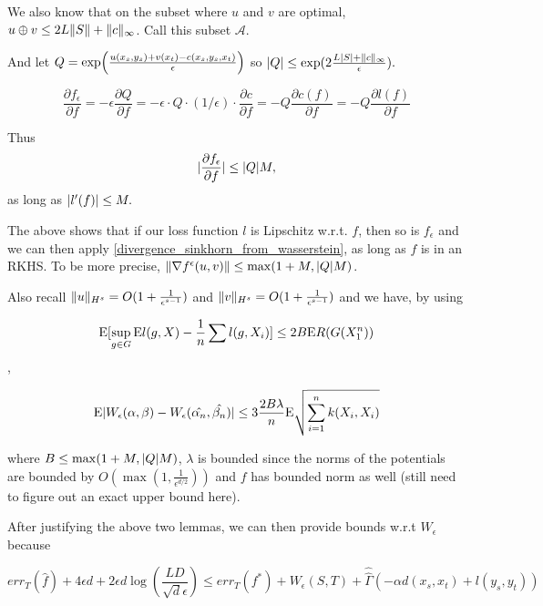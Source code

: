 We also know that on the subset where $u$ and $v$ are optimal, $u\oplus v\leq 2L\lVert S\rVert+\lVert c\rVert_{\infty}$. Call this subset $\mathcal{A}$.

And let $Q=\exp \paren*{\frac{u(x_s,y_s)+v(x_t)-c(x_s,y_s,x_t)}{\epsilon}}$ so $\lvert Q\rvert\leq \exp(2\frac{L\lvert S\rvert+\lVert c\rVert_{\infty}}{\epsilon}).$

$$\frac{\partial f_{\epsilon}}{\partial f} = -\epsilon \frac{\partial Q}{\partial f} = -\epsilon \cdot Q \cdot (1/\epsilon) \cdot \frac{\partial c}{\partial f} = -Q \frac{\partial c(f)}{\partial f} = -Q \frac{\partial l(f)}{\partial f}$$

Thus $$\lvert\frac{\partial f_{\epsilon}}{\partial f}\rvert\leq \lvert Q\rvert M,$$ as long as $\lvert l'(f)\rvert \leq M.$

The above shows that if our loss function $l$ is Lipschitz w.r.t. $f$, then so is $f_{\epsilon}$ and we can then apply \ref{divergence_sinkhorn_from_wasserstein}, as long as $f$ is in an RKHS. To be more precise, $\lVert\nabla f^{\epsilon}(u,v)\rVert\leq \max(1+M,\lvert Q\rvert M)$.

Also recall $\lVert u\rVert_{H^s}=O(1+\frac{1}{\epsilon^{s-1}})$ and $\lVert v\rVert_{H^s}=O(1+\frac{1}{\epsilon^{s-1}})$ and we have, by using

$$ \mathrm{E} [\sup_{g\in G} \mathrm{E} l(g,X) - \frac{1}{n} \sum l(g,X_i)] \leq 2B\mathrm{E} R(G(X_1^n)) $$,

$$ \mathrm{E} \lvert W_{\epsilon}(\alpha,\beta) - W_{\epsilon}(\hat{\alpha_n},\hat{\beta_n})\rvert \leq 3 \frac{2B\lambda}{n} \mathrm{E} \sqrt{\sum_{i=1}^n k(X_i,X_i)} $$

where $B\leq \max(1+M,\lvert Q\rvert M)$, $\lambda$ is bounded since the norms of the potentials are bounded by $O(\max(1,\frac{1}{\epsilon^{d/2}}))$ and $f$ has bounded norm as well (still need to figure out an exact upper bound here).

After justifying the above two lemmas, we can then provide bounds w.r.t $W_{\epsilon}$ because

$$err_{T}(\hat{f}) + 4\epsilon d + 2\epsilon d \log(\frac{LD}{\sqrt{d}\epsilon}) \leq err_{T}(f^{*})+W_{\epsilon}(S,T)+\hat{\hat{\Gamma}}\left(-\alpha
d(x_{s},x_{t})+l(y_{s},y_{t})\right)$$

